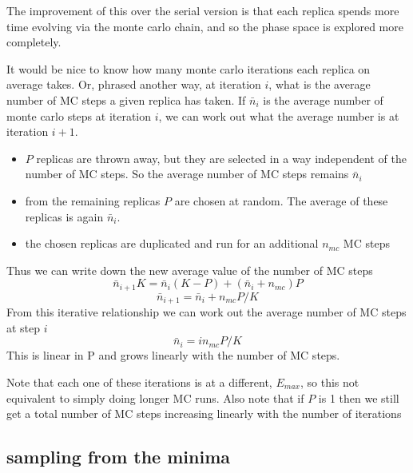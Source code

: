\documentclass[a4paper]{article}
\begin{document}
The improvement of this over the serial version is that each replica spends more time 
evolving via the monte carlo chain, and so the phase space is explored more completely.

It would be nice to know how many monte carlo iterations each replica on
average takes.  Or, phrased another way, at iteration $i$, what is the average
number of MC steps a given replica has taken. If $\bar{n}_i$ is the average number
of monte carlo steps at iteration $i$, we can work out what the average number is
at iteration $i+1$.  

\begin{itemize}
  \item $P$ replicas are thrown away, but they are selected in a way independent of the
    number of MC steps.  So the average number of MC steps remains $\bar{n}_i$
    
  \item from the remaining replicas $P$ are chosen at random.  The average of these
    replicas is again $\bar{n}_i$.

  \item the chosen replicas are duplicated and run for an additional $n_{mc}$ MC steps
\end{itemize}

Thus we can write down the new average value of the number of MC steps
\begin{equation}
  \bar{n}_{i+1} K = \bar{n}_i  (K - P) + (\bar{n}_i + n_{mc}) P
\end{equation}
\begin{equation}
  \bar{n}_{i+1} = \bar{n}_i  +  n_{mc} P / K
  \label{eqn:par_iter}
\end{equation}
From this iterative relationship we can work out the average number of
MC steps at step $i$
\begin{equation}
  \bar{n}_{i} = i n_{mc} P / K
\end{equation}
This is linear in P and grows linearly with the number of MC steps.

Note that each one of these iterations is at a different, $E_{max}$, so this
not equivalent to simply doing longer MC runs. Also note that if $P$ is 1 then
we still get a total number of MC steps increasing linearly with the number of
iterations

\subsection{sampling from the minima}
\end{document}
